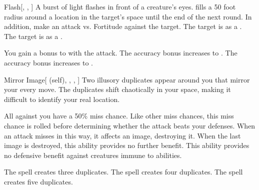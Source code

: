 \lowercase{\hypertarget{spell:Flash}{}}\label{spell:Flash}
\begin{freeability}[Rank 1]{\hypertarget{spell:Flash}{Flash}}[, , ]
A burst of light flashes in front of a creature's eyes.
 fills a 50 foot radius around a location in the target's space until the end of the next round.
In addition, make an attack vs. Fortitude against the target.
\hit The target is  as a .
\crit The target is  as a .

\rankline
{} You gain a  bonus to  with the attack.
 The accuracy bonus increases to .
 The accuracy bonus increases to .

\end{freeability}
\vspace{0.25em}



\lowercase{\hypertarget{spell:Mirror Image}{}}\label{spell:Mirror Image}
\begin{attuneability}[Rank 1]{\hypertarget{spell:Mirror Image}{Mirror Image}}[ (self), , , ]
Two illusory duplicates appear around you that mirror your every move.
The duplicates shift chaotically in your space, making it difficult to identify your real location.

All  against you have a 50\% miss chance.
Like other miss chances, this miss chance is rolled before determining whether the attack beats your defenses.
When an attack misses in this way, it affects an image, destroying it.
When the last image is destroyed, this ability provides no further benefit.
This ability provides no defensive benefit against creatures immune to  abilities.

\rankline
{} The spell creates three duplicates.
 The spell creates four duplicates.
 The spell creates five duplicates.

\end{attuneability}
\vspace{0.25em}



